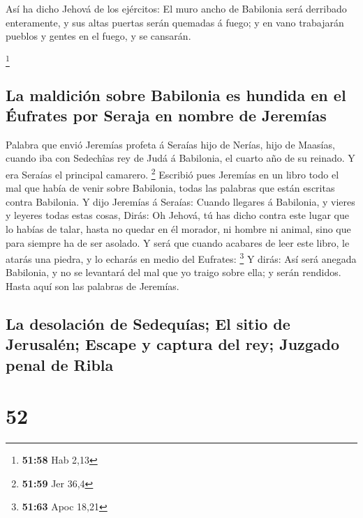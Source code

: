  Así ha dicho Jehová de los ejércitos: El muro ancho de
Babilonia será derribado enteramente, y sus altas puertas serán quemadas
á fuego; y en vano trabajarán pueblos y gentes en el fuego, y se
cansarán.

\footnote{\textbf{51:58} Hab 2,13}

\hypertarget{la-maldiciuxf3n-sobre-babilonia-es-hundida-en-el-uxe9ufrates-por-seraja-en-nombre-de-jeremuxedas}{%
\subsection{La maldición sobre Babilonia es hundida en el Éufrates por
Seraja en nombre de
Jeremías}\label{la-maldiciuxf3n-sobre-babilonia-es-hundida-en-el-uxe9ufrates-por-seraja-en-nombre-de-jeremuxedas}}

 Palabra que envió Jeremías profeta á Seraías hijo de
Nerías, hijo de Maasías, cuando iba con Sedechîas rey de Judá á
Babilonia, el cuarto año de su reinado. Y era Seraías el principal
camarero. \footnote{\textbf{51:59} Jer 36,4}  Escribió pues
Jeremías en un libro todo el mal que había de venir sobre Babilonia,
todas las palabras que están escritas contra Babilonia.  Y
dijo Jeremías á Seraías: Cuando llegares á Babilonia, y vieres y leyeres
todas estas cosas,  Dirás: Oh Jehová, tú has dicho contra
este lugar que lo habías de talar, hasta no quedar en él morador, ni
hombre ni animal, sino que para siempre ha de ser asolado. 
Y será que cuando acabares de leer este libro, le atarás una piedra, y
lo echarás en medio del Eufrates: \footnote{\textbf{51:63} Apoc 18,21}
 Y dirás: Así será anegada Babilonia, y no se levantará del
mal que yo traigo sobre ella; y serán rendidos. Hasta aquí son las
palabras de Jeremías.

\hypertarget{la-desolaciuxf3n-de-sedequuxedas-el-sitio-de-jerusaluxe9n-escape-y-captura-del-rey-juzgado-penal-de-ribla}{%
\subsection{La desolación de Sedequías; El sitio de Jerusalén; Escape y
captura del rey; Juzgado penal de
Ribla}\label{la-desolaciuxf3n-de-sedequuxedas-el-sitio-de-jerusaluxe9n-escape-y-captura-del-rey-juzgado-penal-de-ribla}}

\hypertarget{section-51}{%
\section{52}\label{section-51}}

